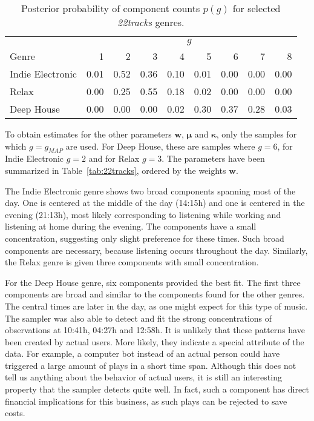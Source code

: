 \begin{table}[ht]
	\caption{Posterior probability of component counts $p(g)$ for selected \textit{22tracks} genres.}
	\centering
	\begin{tabular}{lrrrrrrrr}
		\hline
		& \multicolumn{8}{c}{$g$}\\
		Genre & 1 & 2 & 3 & 4 & 5 & 6 & 7 & 8 \\
		\hline
		Indie Electronic & 0.01 & 0.52 & 0.36 & 0.10 & 0.01 & 0.00 & 0.00 & 0.00 \\
		Relax & 0.00 & 0.25 & 0.55 & 0.18 & 0.02 & 0.00 & 0.00 & 0.00 \\
		Deep House & 0.00 & 0.00 & 0.00 & 0.02 & 0.30 & 0.37 & 0.28 & 0.03 \\
		\hline
	\end{tabular}
	\label{tab:posterior-g}
\end{table}


To obtain estimates for the other parameters $\bm w$, $\bm \mu$ and $\bm \kappa$, only the samples for which $g = g_{MAP}$ are used. For Deep House, these are samples where $g=6$, for Indie Electronic $g=2$ and for Relax $g=3$. The parameters have been summarized in Table~\ref{tab:22tracks}, ordered by the weights $\bm w$. 

The Indie Electronic genre shows two broad components spanning most of the day. One is centered at the middle of the day (14:15h) and one is centered in the evening (21:13h), most likely corresponding to listening while working and listening at home during the evening. The components have a small concentration, suggesting only slight preference for these times. Such broad components are necessary, because listening occurs throughout the day. Similarly, the Relax genre is given three components with small concentration. 

For the Deep House genre, six components provided the best fit. The first three components are broad and similar to the components found for the other genres. The central times are later in the day, as one might expect for this type of music. The sampler was also able to detect and fit the strong concentrations of observations at 10:41h, 04:27h and 12:58h. It is unlikely that these patterns have been created by actual users. More likely, they indicate a special attribute of the data. For example, a computer bot instead of an actual person could have triggered a large amount of plays in a short time span. Although this does not tell us anything about the behavior of actual users, it is still an interesting property that the sampler detects quite well. In fact, such a component has direct financial implications for this business, as such plays can be rejected to save costs. 

